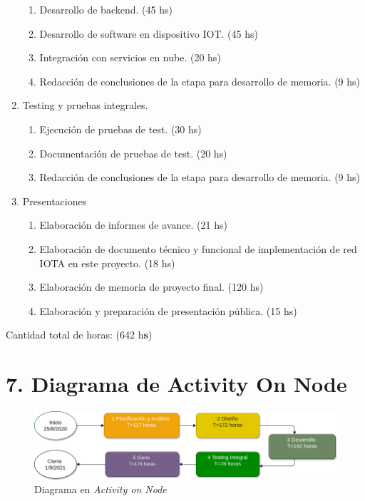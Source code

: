 \documentclass[11pt]{charter}
\begin{document}
\begin{enumerate}
\begin{enumerate}
	\item Desarrollo de backend. (45  hs)
	\item Desarrollo de software en dispositivo IOT.  (45 hs)
	\item Integración con servicios en nube. (20 hs)
	\item Redacción de conclusiones de la etapa para desarrollo de memoria. (9 hs)
	\end{enumerate}
\item Testing y pruebas integrales.
	\begin{enumerate}
	\item Ejecución de pruebas de test. (30 hs)
	\item Documentación de pruebas de test. (20 hs)
	\item Redacción de conclusiones de la etapa para desarrollo de memoria. (9 hs)
	\end{enumerate}
\item Presentaciones
	\begin{enumerate}
	\item Elaboración de informes de avance. (21 hs)
	\item Elaboración de documento técnico y funcional de implementación de red IOTA en este proyecto. (18 hs)
	\item Elaboración de memoria de proyecto final. (120 hs) 
	\item Elaboración y preparación de presentación pública.  (15 hs)
	\end{enumerate}
\end{enumerate}

Cantidad total de horas: (642 h\textbf{s})


\section{7. Diagrama de Activity On Node}
\label{sec:AoN}



\begin{figure}[htpb]
\centering 
\includegraphics[width=.8\textwidth]{./Figuras/AoN.png}
\caption{Diagrama en \textit{Activity on Node}}
\label{fig:AoN}
\end{figure}
\end{document}

